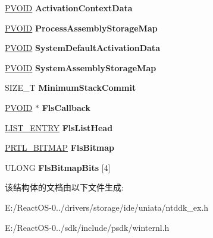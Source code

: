 \begin{DoxyCompactItemize}
\item 
\mbox{\label{struct___p_e_b_a4af85640e645abea7904b2b68b923b0b}} 
\hyperlink{interfacevoid}{P\+V\+O\+ID} {\bfseries Activation\+Context\+Data}
\item 
\mbox{\label{struct___p_e_b_adcc61e4a20e5677ca9a4878231f958df}} 
\hyperlink{interfacevoid}{P\+V\+O\+ID} {\bfseries Process\+Assembly\+Storage\+Map}
\item 
\mbox{\label{struct___p_e_b_a2e994f214a1d448c23c2af4afd1082c5}} 
\hyperlink{interfacevoid}{P\+V\+O\+ID} {\bfseries System\+Default\+Activation\+Data}
\item 
\mbox{\label{struct___p_e_b_a7da9ab10596c2d1882337eada0c22262}} 
\hyperlink{interfacevoid}{P\+V\+O\+ID} {\bfseries System\+Assembly\+Storage\+Map}
\item 
\mbox{\label{struct___p_e_b_aac997cf21c18251dc7c28ef4c129fa12}} 
S\+I\+Z\+E\+\_\+T {\bfseries Minimum\+Stack\+Commit}
\item 
\mbox{\label{struct___p_e_b_a445e98e7933d5bfc35791d04c3fbeaf4}} 
\hyperlink{interfacevoid}{P\+V\+O\+ID} $\ast$ {\bfseries Fls\+Callback}
\item 
\mbox{\label{struct___p_e_b_ac4258c5310ddb5a1215955e2e60cc4db}} 
\hyperlink{struct___l_i_s_t___e_n_t_r_y}{L\+I\+S\+T\+\_\+\+E\+N\+T\+RY} {\bfseries Fls\+List\+Head}
\item 
\mbox{\label{struct___p_e_b_acd91eed89c5f551f7d86629a8d34717b}} 
\hyperlink{struct___r_t_l___b_i_t_m_a_p}{P\+R\+T\+L\+\_\+\+B\+I\+T\+M\+AP} {\bfseries Fls\+Bitmap}
\item 
\mbox{\label{struct___p_e_b_ad4b9dc6b45a1900bbc7a73662b1da753}} 
U\+L\+O\+NG {\bfseries Fls\+Bitmap\+Bits} \mbox{[}4\mbox{]}
\end{DoxyCompactItemize}


该结构体的文档由以下文件生成\+:\begin{DoxyCompactItemize}
\item 
E\+:/\+React\+O\+S-\/0../drivers/storage/ide/uniata/ntddk\+\_\+ex.\+h\item 
E\+:/\+React\+O\+S-\/0../sdk/include/psdk/winternl.\+h\end{DoxyCompactItemize}
